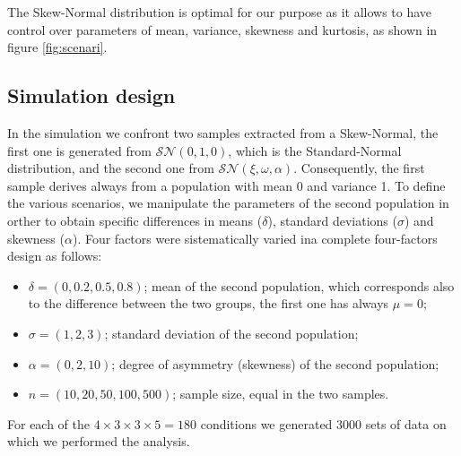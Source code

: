 \documentclass[twocolumn]{article}\usepackage[]{graphicx}\usepackage[]{xcolor}
\begin{document}
The Skew-Normal distribution is optimal for our purpose as it allows to have control over parameters of mean, variance, skewness and kurtosis, as shown in figure \ref{fig:scenari}.

\subsection{Simulation design}




In the simulation we confront two samples extracted from a Skew-Normal, the first one is generated from $\mathcal{SN}(0,1,0)$, which is the Standard-Normal distribution, and the second one from $\mathcal{SN}(\xi,\omega,\alpha)$. Consequently, the first sample derives always from a population with mean 0 and variance 1. To define the various scenarios, we manipulate the parameters of the second population in orther to obtain specific differences in means ($\delta$), standard deviations ($\sigma$) and skewness ($\alpha$). Four factors were sistematically varied ina complete four-factors design as follows:

\begin{itemize}

   \item $\delta = (0, 0.2, 0.5, 0.8)$; mean of the second population, which corresponds also to the difference between the two groups, the first one has always $\mu = 0$;
  \item $\sigma = (1, 2, 3)$; standard deviation of the second population;
  \item $\alpha = (0, 2, 10)$; degree of asymmetry (skewness) of the second population; 
  \item $n = (10, 20, 50, 100, 500)$; sample size, equal in the two samples.
 

\end{itemize}


For each of the $4 \times 3 \times 3 \times 5 = 180$ conditions we generated 3000 sets of data on which we performed the analysis. 
\end{document}
